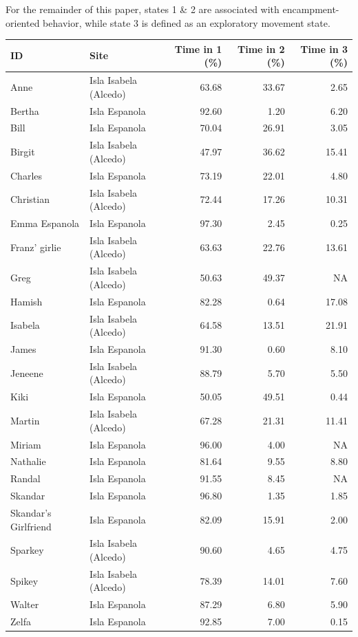 \documentclass{article}
\begin{document}
For the remainder of this paper, states 1 \& 2 are associated with
encampment-oriented behavior, while state 3 is defined as an exploratory
movement state.

\begin{table}
\centering
\begin{tabular}[t]{llrrr}
\toprule
ID & Site & Time in 1 (\%) & Time in 2 (\%) & Time in 3 (\%)\\
\midrule
Anne & Isla Isabela (Alcedo) & 63.68 & 33.67 & 2.65\\
Bertha & Isla Espanola & 92.60 & 1.20 & 6.20\\
Bill & Isla Espanola & 70.04 & 26.91 & 3.05\\
Birgit & Isla Isabela (Alcedo) & 47.97 & 36.62 & 15.41\\
Charles & Isla Espanola & 73.19 & 22.01 & 4.80\\
Christian & Isla Isabela (Alcedo) & 72.44 & 17.26 & 10.31\\
Emma Espanola & Isla Espanola & 97.30 & 2.45 & 0.25\\
Franz' girlie & Isla Isabela (Alcedo) & 63.63 & 22.76 & 13.61\\
Greg & Isla Isabela (Alcedo) & 50.63 & 49.37 & NA\\
Hamish & Isla Espanola & 82.28 & 0.64 & 17.08\\
Isabela & Isla Isabela (Alcedo) & 64.58 & 13.51 & 21.91\\
James & Isla Espanola & 91.30 & 0.60 & 8.10\\
Jeneene & Isla Isabela (Alcedo) & 88.79 & 5.70 & 5.50\\
Kiki & Isla Espanola & 50.05 & 49.51 & 0.44\\
Martin & Isla Isabela (Alcedo) & 67.28 & 21.31 & 11.41\\
Miriam & Isla Espanola & 96.00 & 4.00 & NA\\
Nathalie & Isla Espanola & 81.64 & 9.55 & 8.80\\
Randal & Isla Espanola & 91.55 & 8.45 & NA\\
Skandar & Isla Espanola & 96.80 & 1.35 & 1.85\\
Skandar's Girlfriend & Isla Espanola & 82.09 & 15.91 & 2.00\\
Sparkey & Isla Isabela (Alcedo) & 90.60 & 4.65 & 4.75\\
Spikey & Isla Isabela (Alcedo) & 78.39 & 14.01 & 7.60\\
Walter & Isla Espanola & 87.29 & 6.80 & 5.90\\
Zelfa & Isla Espanola & 92.85 & 7.00 & 0.15\\
\bottomrule
\end{tabular}
\end{table}
\end{document}
